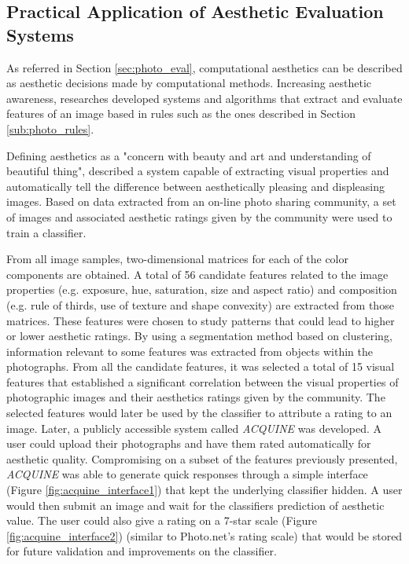 \subsection{Practical Application of Aesthetic Evaluation Systems}
\label{sub:eval_applications}

As referred in Section \ref{sec:photo_eval}, computational aesthetics can be described as aesthetic decisions made by computational methods. Increasing aesthetic awareness, researches developed systems and algorithms that extract and evaluate features of an image based in rules such as the ones described in Section \ref{sub:photo_rules}.

Defining aesthetics as a "concern with beauty and art and understanding of beautiful thing", \citeauthor{datta2006studying} \cite{datta2006studying} described a system capable of extracting visual properties and automatically tell the difference between aesthetically pleasing and displeasing images. 
Based on data extracted from an on-line photo sharing community, a set of images and associated aesthetic ratings given by the community were used to train a classifier.

From all image samples, two-dimensional matrices for each of the color components are obtained. A total of 56 candidate features related to the image properties (e.g. exposure, hue, saturation, size and aspect ratio) and composition (e.g. rule of thirds, use of texture and shape convexity) are extracted from those matrices. 
These features were chosen to study patterns that could lead to higher or lower aesthetic ratings. By using a segmentation method based on clustering, information relevant to some features was extracted from objects within the photographs.
From all the candidate features, it was selected a total of 15 visual features that established a significant correlation between the visual properties of photographic images and their aesthetics ratings given by the community. The selected features would later be used by the classifier to attribute a rating to an image.
Later, a publicly accessible system called \emph{ACQUINE} \cite{datta2010acquine} was developed. A user could upload their photographs and have them rated automatically for aesthetic quality. Compromising on a subset of the features previously presented, \emph{ACQUINE} was able to generate quick responses through a simple interface (Figure \ref{fig:acquine_interface1}) that kept the underlying classifier hidden. A user would then submit an image and wait for the classifiers prediction of aesthetic value. The user could also give a rating on a 7-star scale (Figure \ref{fig:acquine_interface2}) (similar to Photo.net's rating scale) that would be stored for future validation and improvements on the classifier.

